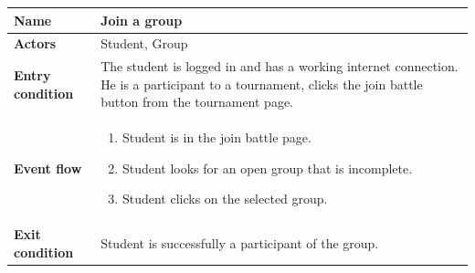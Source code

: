 \documentclass{article}
\begin{document}
\begin{enumerate}[label=\textbf{UC\arabic*}:]
        \begin{center}
        \begin{tabular}{ | m{8em} | m{10cm}|  } 
            \hline 
            \textbf{Name} & Join a group\\[1ex] 
            \hline 
            \textbf{Actors} & Student, Group\\[1ex] 
            \hline 
            \textbf{Entry condition} & The student is logged in and has a working internet connection. He is a participant to a tournament, clicks the join battle button from the tournament page.  \\[1ex]
            \hline 
            \textbf{Event flow} & \begin{enumerate}[label=\textbf{\arabic*}:]
                \item Student is in the join battle page.
                \item Student looks for an open group that is incomplete.
                \item Student clicks on the selected group.
            \end{enumerate} \\[1ex]
            \hline 
            \textbf{Exit condition} & Student is successfully a participant of the group.\\[1ex]
            \hline 
        \end{tabular}
        \end{center}











\end{enumerate}
\end{document}
